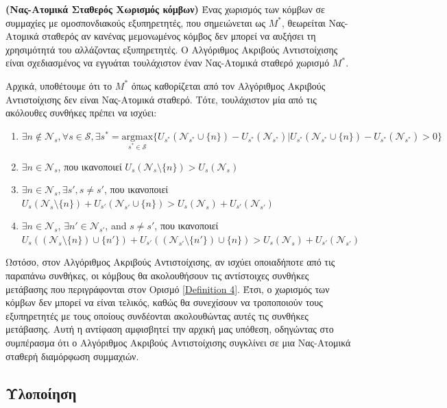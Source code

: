 \label{Theorem 1} \textbf{(Νας-Ατομικά Σταθερός Χωρισμός κόμβων)} Ένας χωρισμός των κόμβων σε συμμαχίες με ομοσπονδιακούς εξυπηρετητές, που σημειώνεται ως $M^*$, θεωρείται Νας-Ατομικά σταθερός αν κανένας μεμονωμένος κόμβος δεν μπορεί να αυξήσει τη χρησιμότητά του αλλάζοντας εξυπηρετητές. Ο Αλγόριθμος Ακριβούς Αντιστοίχισης είναι σχεδιασμένος να εγγυάται τουλάχιστον έναν Νας-Ατομικά σταθερό χωρισμό $M^*$.

Αρχικά, υποθέτουμε ότι το $M^*$ όπως καθορίζεται από τον Αλγόριθμος Ακριβούς Αντιστοίχισης δεν είναι Νας-Ατομικά σταθερό. Τότε, τουλάχιστον μία από τις ακόλουθες συνθήκες πρέπει να ισχύει: 

\begin{enumerate}
    \item $\exists n \notin \mathcal{N}_s, \forall s \in \mathcal{S},  \exists s^* = \underset{s^* \in \mathcal{S}}{\text{argmax}} \{U_{s^*}( \mathcal{N}_{s^*} \cup \{n\}) - U_{s^*}(\mathcal{N}_{s^*}) | U_{s^*}(\mathcal{N}_{s^*}\cup \{n\}) - U_{s^*}( \mathcal{N}_{s^*}) > 0\}$
    \item $\exists n \in \mathcal{N}_s$, που ικανοποιεί $U_{s}(\mathcal{N}_{s}\setminus\{n\})> U_{s}(\mathcal{N}_{s})$
    \item $\exists n \in \mathcal{N}_{s}, \exists s', s \neq s'$, που ικανοποιεί $U_{s}(\mathcal{N}_{s} \setminus \{n\}) + U_{s'}(\mathcal{N}_{s'}\cup\{n\})>U_{s}(\mathcal{N}_{s}) +U_{s'}(\mathcal{N}_{s'})$
    \item $\exists n \in \mathcal{N}_{s}$, $\exists n' \in \mathcal{N}_{s'}$, and $s \neq s'$, που ικανοποιεί $U_{s}((\mathcal{N}_{s} \setminus \{n\})\cup\{n'\}) + U_{s'}((\mathcal{N}_{s'}\setminus\{n'\})\cup\{n\})>U_{s}(\mathcal{N}_{s}) +U_{s'}(\mathcal{N}_{s'})$
\end{enumerate}

Ωστόσο, στον Αλγόριθμος Ακριβούς Αντιστοίχισης, αν ισχύει οποιαδήποτε από τις παραπάνω συνθήκες, οι κόμβους θα ακολουθήσουν τις αντίστοιχες συνθήκες μετάβασης που περιγράφονται στον Ορισμό \ref{Definition 4}. Έτσι, ο χωρισμός των κόμβων δεν μπορεί να είναι τελικός, καθώς θα συνεχίσουν να τροποποιούν τους εξυπηρετητές με τους οποίους συνδέονται ακολουθώντας αυτές τις συνθήκες μετάβασης. Αυτή η αντίφαση αμφισβητεί την αρχική μας υπόθεση, οδηγώντας στο συμπέρασμα ότι ο Αλγόριθμος Ακριβούς Αντιστοίχισης συγκλίνει σε μια Νας-Ατομικά σταθερή διαμόρφωση συμμαχιών.

\subsection{Υλοποίηση}

